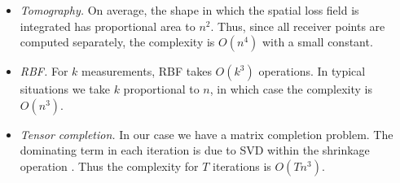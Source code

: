 \documentclass[10pt,a4paper]{article}
\begin{document}
\begin{itemize}
    \item
    \emph{Tomography.}  On average, the shape in which the spatial loss field is integrated has proportional area to $n^2$. Thus, since all receiver points are computed separately, the complexity is $O(n^4)$ with a small constant.
    \item
    \emph{RBF.}
    For $k$ measurements, RBF takes $O(k^3)$ operations. In typical situations we take $k$ proportional to $n$, in which case the complexity is $O(n^3)$.
    \item
    \emph{Tensor completion.} In our case we have a matrix completion problem. 
    The dominating term in each iteration is due to SVD within the shrinkage operation \cite{Gandy_2011}. Thus the complexity for $T$ iterations is $O(Tn^3)$. 
\end{itemize}
\end{document}
